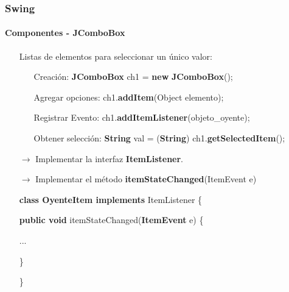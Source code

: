 \documentclass{beamer}
\begin{document}
    \begin{frame}
		\frametitle{Swing}
		\framesubtitle{Componentes - JComboBox}

        \begin{itemize}
		    \item[\checkmark] Listas de elementos para seleccionar un \'unico valor:
		    \begin{itemize}
        		    \item[] Creaci\'on: \textbf{JComboBox} ch1 = \textbf{new} \textbf{JComboBox}();
        		    \item[] Agregar opciones: ch1.\textbf{addItem}(Object elemento);
        		    \item[] Registrar Evento: ch1.\textbf{addItemListener}(objeto\_oyente);
        		    \item[] Obtener selecci\'on: \textbf{String} val = (\textbf{String}) ch1.\textbf{getSelectedItem}();
	    	    \end{itemize}
	    	    \item[$\rightarrow$] Implementar la interfaz \textbf{ItemListener}.
	    	    \item[$\rightarrow$] Implementar el m\'etodo \textbf{itemStateChanged}(ItemEvent e)
	    	    \item[] \textbf{class OyenteItem implements} ItemListener \{
	    	    \item[] \hspace{10pt} \textbf{public void} itemStateChanged(\textbf{ItemEvent} e) \{
            \item[] \hspace{10pt} ...
            \item[] \hspace{10pt}\}
            \item[] \}
		\end{itemize}

	\end{frame}
\end{document}

